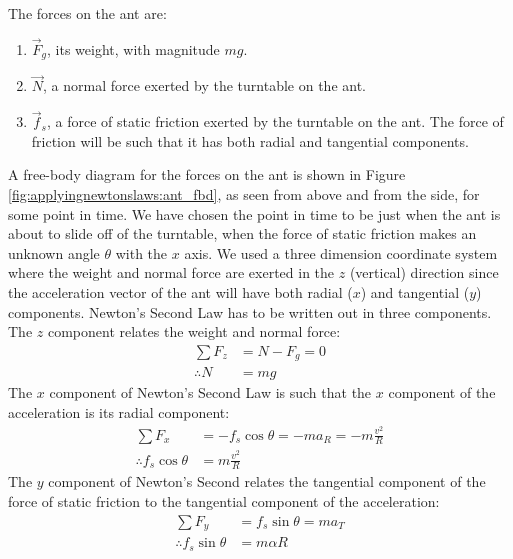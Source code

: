 \begin{example}
The forces on the ant are:
\begin{enumerate}
\item $\vec F_g$, its weight, with magnitude $mg$.
\item $\vec N$, a normal force exerted by the turntable on the ant.
\item $\vec f_s$, a force of static friction exerted by the turntable on the ant. The force of friction will be such that it has both radial and tangential components.
\end{enumerate}
A free-body diagram for the forces on the ant is shown in Figure \ref{fig:applyingnewtonslaws:ant_fbd}, as seen from above and from the side, for some point in time. We have chosen the point in time to be just when the ant is about to slide off of the turntable, when the force of static friction makes an unknown angle $\theta$ with the $x$ axis. We used a three dimension coordinate system where the weight and normal force are exerted in the $z$ (vertical) direction since the acceleration vector of the ant will have both radial ($x$) and tangential ($y$) components.
Newton's Second Law has to be written out in three components. The $z$ component relates the weight and normal force:
\begin{align*}
\sum F_z &= N - F_g = 0\\
\therefore N&=mg
\end{align*}
The $x$ component of Newton's Second Law is such that the $x$ component of the acceleration is its radial component:
\begin{align*}
\sum F_x &= -f_s\cos\theta = -ma_R = -m\frac{v^2}{R}\\
\therefore f_s\cos\theta &= m\frac{v^2}{R}
\end{align*}
The $y$ component of Newton's Second relates the tangential component of the force of static friction to the tangential component of the acceleration:
\begin{align*}
\sum F_y &= f_s\sin\theta = ma_T \\
\therefore f_s\sin\theta &= m\alpha R
\end{align*}

\end{example}
